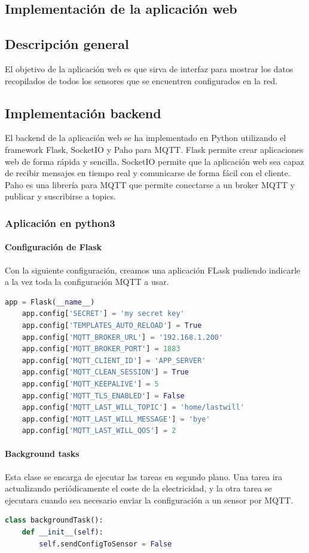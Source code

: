 \begin{titlepage}
\chapter{Implementación de la aplicación web}
\section{Descripción general}
El objetivo de la aplicación web es que sirva de interfaz para mostrar los datos recopilados de todos los sensores que se encuentren configurados en la red.
\section{Implementación backend}
El backend de la aplicación web se ha implementado en Python utilizando el framework Flask, SocketIO y Paho para MQTT. Flask permite crear aplicaciones web de forma rápida y sencilla. SocketIO permite que la aplicación web sea capaz de recibir mensajes en tiempo real y comunicarse de forma fácil con el cliente. Paho es una librería para MQTT que permite conectarse a un broker MQTT y publicar y suscribirse a topics.
\subsection{Aplicación en python3}
\subsubsection{Configuración de Flask}
Con la siguiente configuración, creamos una aplicación FLask pudiendo indicarle a la vez toda la configuración MQTT a usar.
\begin{lstlisting}[language=python]
	app = Flask(__name__)
	app.config['SECRET'] = 'my secret key'
	app.config['TEMPLATES_AUTO_RELOAD'] = True
	app.config['MQTT_BROKER_URL'] = '192.168.1.200'
	app.config['MQTT_BROKER_PORT'] = 1883
	app.config['MQTT_CLIENT_ID'] = 'APP_SERVER'
	app.config['MQTT_CLEAN_SESSION'] = True
	app.config['MQTT_KEEPALIVE'] = 5
	app.config['MQTT_TLS_ENABLED'] = False
	app.config['MQTT_LAST_WILL_TOPIC'] = 'home/lastwill'
	app.config['MQTT_LAST_WILL_MESSAGE'] = 'bye'
	app.config['MQTT_LAST_WILL_QOS'] = 2
\end{lstlisting}

\subsubsection{Background tasks}
Esta clase se encarga de ejecutar las tareas en segundo plano. Una tarea ira actualizando periódicamente el coste de la electricidad, y la otra tarea se ejecutara cuando sea necesario enviar la configuración a un sensor por MQTT.\\
\begin{lstlisting}[language=python]
class backgroundTask():
    def __init__(self):
        self.sendConfigToSensor = False


\end{lstlisting}
\end{titlepage}
